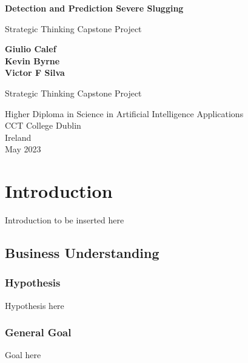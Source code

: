 \documentclass{article}
\begin{document}
\begin{titlepage}
   \begin{center}
       \vspace*{1cm}

       \textbf{Detection and Prediction Severe Slugging}

       \vspace{0.5cm}
        Strategic Thinking Capstone Project
            
       \vspace{1.5cm}

       \textbf{Giulio Calef} \\
       \textbf{Kevin Byrne} \\
       \textbf{Victor F Silva} \\

       \vfill
            
       Strategic Thinking Capstone Project
            
       \vspace{0.8cm}
     
            
       Higher Diploma in Science in Artificial Intelligence Applications\\
       CCT College Dublin\\
       Ireland\\
       May 2023
            
   \end{center}
\end{titlepage}

\section{Introduction}
Introduction to be inserted here

\subsection{Business Understanding}

\subsubsection{Hypothesis}
Hypothesis here

\subsubsection{General Goal}
Goal here
\end{document}
